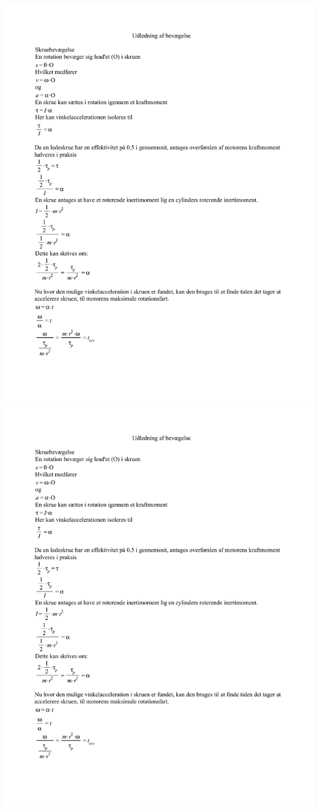 \newpage
\includegraphics[scale=0.8,page=2]{bilag/Media/Media/Udledning.pdf}
\newpage
\includegraphics[scale=0.8,page=3]{bilag/Media/Media/Udledning.pdf}
\newpage
